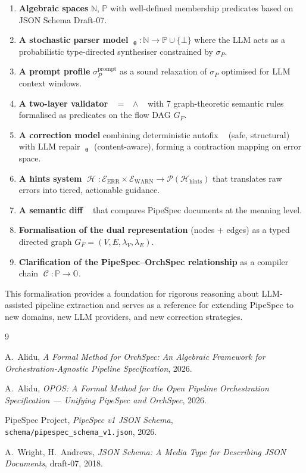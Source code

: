 \documentclass[11pt,a4paper]{article}
\theoremstyle{definition}
\DeclareMathOperator{\ExtractLLM}{\mathcal{E}_{\bm\theta}}
\DeclareMathOperator{\ValidateP}{\mathcal{V}_P}
\DeclareMathOperator{\ValidateSchemaP}{\mathcal{V}_S}
\DeclareMathOperator{\ValidateSemanticP}{\mathcal{V}_\Sigma}
\DeclareMathOperator{\AutofixMulti}{\mathcal{A}^*}
\DeclareMathOperator{\RepairLLM}{\mathcal{R}_{\bm\theta}}
\DeclareMathOperator{\DiffP}{\Delta_P}
\DeclareMathOperator{\Hints}{\mathcal{H}}
\DeclareMathOperator{\Compile}{\mathcal{C}}
\newcommand{\nspace}{\mathbb{N}}
\newcommand{\pspace}{\mathbb{P}}
\newcommand{\ospace}{\mathbb{O}}
\newcommand{\errs}{\mathcal{E}_{\text{ERR}}}
\newcommand{\warns}{\mathcal{E}_{\text{WARN}}}
\newcommand{\hintspace}{\mathcal{H}_{\text{hints}}}
\begin{document}
\begin{enumerate}[label={(\arabic*)}]
    \item \textbf{Algebraic spaces} $\nspace$, $\pspace$ with well-defined membership predicates based on JSON Schema Draft-07.
    \item \textbf{A stochastic parser model} $\ExtractLLM_{\bm\theta} : \nspace \to \pspace \cup \{\bot\}$ where the LLM acts as a probabilistic type-directed synthesiser constrained by $\sigma_P$.
    \item \textbf{A prompt profile} $\sigma_P^{\text{prompt}}$ as a sound relaxation of $\sigma_P$ optimised for LLM context windows.
    \item \textbf{A two-layer validator} $\ValidateP = \ValidateSchemaP \land \ValidateSemanticP$ with 7 graph-theoretic semantic rules formalised as predicates on the flow DAG $G_F$.
    \item \textbf{A correction model} combining deterministic autofix $\AutofixMulti$ (safe, structural) with LLM repair $\RepairLLM_{\bm\theta}$ (content-aware), forming a contraction mapping on error space.
    \item \textbf{A hints system} $\Hints : \errs \times \warns \to \mathcal{P}(\hintspace)$ that translates raw errors into tiered, actionable guidance.
    \item \textbf{A semantic diff} $\DiffP$ that compares PipeSpec documents at the meaning level.
    \item \textbf{Formalisation of the dual representation} (nodes + edges) as a typed directed graph $G_F = (V, E, \lambda_V, \lambda_E)$.
    \item \textbf{Clarification of the PipeSpec–OrchSpec relationship} as a compiler chain $\Compile : \pspace \to \ospace$.
\end{enumerate}

This formalisation provides a foundation for rigorous reasoning about LLM-assisted pipeline extraction and serves as a reference for extending PipeSpec to new domains, new LLM providers, and new correction strategies.

\begin{thebibliography}{9}

A.~Alidu, \emph{A Formal Method for OrchSpec: An Algebraic Framework for Orchestration-Agnostic Pipeline Specification}, 2026.

A.~Alidu, \emph{OPOS: A Formal Method for the Open Pipeline Orchestration Specification --- Unifying PipeSpec and OrchSpec}, 2026.

PipeSpec Project, \emph{PipeSpec v1 JSON Schema}, \texttt{schema/pipespec\_schema\_v1.json}, 2026.

A.~Wright, H.~Andrews, \emph{JSON Schema: A Media Type for Describing JSON Documents}, draft-07, 2018.

\end{thebibliography}
\end{document}
